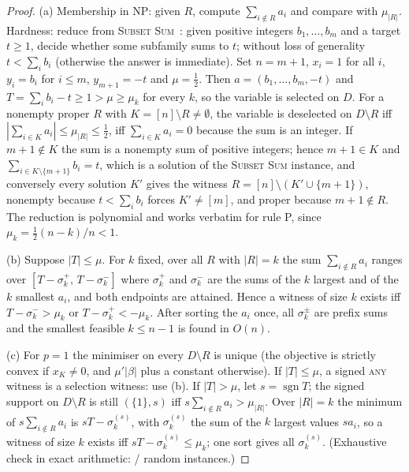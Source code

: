 \documentclass[10pt,a4paper]{article}
\theoremstyle{plain}
\theoremstyle{definition}
\theoremstyle{remark}
\newcommand{\sgn}{\operatorname{sgn}}
\newcommand{\Dm}{D\setminus R}
\newcommand{\tsc}[1]{\textnormal{\textsc{#1}}}  %
\begin{document}
\begin{proof}
(a) Membership in NP: given $R$, compute $\sum_{i\notin R}a_i$ and compare with $\mu_{|R|}$. Hardness: reduce from \tsc{Subset Sum}~\citep{karp1972,garey1979}: given positive integers $b_1,\dots,b_m$ and a target $t\ge1$, decide whether some subfamily sums to $t$; without loss of generality $t<\sum_ib_i$ (otherwise the answer is immediate). Set $n=m+1$, $x_i=1$ for all $i$, $y_i=b_i$ for $i\le m$, $y_{m+1}=-t$ and $\mu=\tfrac12$. Then $a=(b_1,\dots,b_m,-t)$ and $T=\sum_ib_i-t\ge1>\mu\ge\mu_k$ for every $k$, so the variable is selected on $D$. For a nonempty proper $R$ with $K=[n]\setminus R\neq\emptyset$, the variable is deselected on $\Dm$ iff $|\sum_{i\in K}a_i|\le\mu_{|R|}\le\tfrac12$, iff $\sum_{i\in K}a_i=0$ because the sum is an integer. If $m+1\notin K$ the sum is a nonempty sum of positive integers; hence $m+1\in K$ and $\sum_{i\in K\setminus\{m+1\}}b_i=t$, which is a solution of the \tsc{Subset Sum} instance, and conversely every solution $K'$ gives the witness $R=[n]\setminus(K'\cup\{m+1\})$, nonempty because $t<\sum_ib_i$ forces $K'\neq[m]$, and proper because $m+1\notin R$. The reduction is polynomial and works verbatim for rule P, since $\mu_k=\tfrac12(n-k)/n<1$.

(b) Suppose $|T|\le\mu$. For $k$ fixed, over all $R$ with $|R|=k$ the sum $\sum_{i\notin R}a_i$ ranges over $[T-\sigma^+_k,\,T-\sigma^-_k]$ where $\sigma^+_k$ and $\sigma^-_k$ are the sums of the $k$ largest and of the $k$ smallest $a_i$, and both endpoints are attained. Hence a witness of size $k$ exists iff $T-\sigma^-_k>\mu_k$ or $T-\sigma^+_k<-\mu_k$. After sorting the $a_i$ once, all $\sigma^\pm_k$ are prefix sums and the smallest feasible $k\le n-1$ is found in $O(n)$.

(c) For $p=1$ the minimiser on every $\Dm$ is unique (the objective is strictly convex if $x_K\ne0$, and $\mu'|\beta|$ plus a constant otherwise). If $|T|\le\mu$, a signed \tsc{any} witness is a selection witness: use (b). If $|T|>\mu$, let $s=\sgn T$; the signed support on $\Dm$ is still $(\{1\},s)$ iff $s\sum_{i\notin R}a_i>\mu_{|R|}$. Over $|R|=k$ the minimum of $s\sum_{i\notin R}a_i$ is $sT-\sigma^{(s)}_k$, with $\sigma^{(s)}_k$ the sum of the $k$ largest values $sa_i$, so a witness of size $k$ exists iff $sT-\sigma^{(s)}_k\le\mu_k$; one sort gives all $\sigma^{(s)}_k$. (Exhaustive check in exact arithmetic: \SignedPOneAgree/\SignedPOneTotal{} random instances.)
\end{proof}
\end{document}
